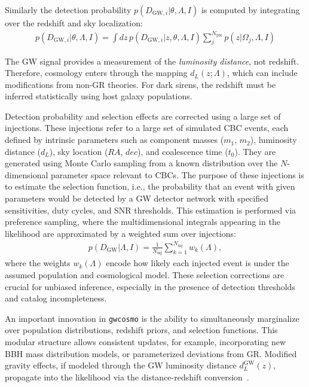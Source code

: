 Similarly the detection probability $p(D_{\mathrm{GW},i} |\theta, \Lambda, I)$ is computed by integrating over the redshift and sky localization:
\begin{align}
    p(D_{\mathrm{GW},i} | \theta, \Lambda, I) = \int dz\, p(D_{\mathrm{GW},i} | z, \theta, \Lambda, I) \sum_{j}^{N_{\mathrm{pix}}} p(z | \Omega_j,\Lambda, I)
\end{align}

The GW signal provides a measurement of the \textit{luminosity distance}, not redshift. Therefore, cosmology enters through the mapping $d_L(z; \Lambda)$, which can include modifications from non-GR theories. For dark sirens, the redshift must be inferred statistically using host galaxy populations. 

Detection probability and selection effects are corrected using a large set of injections. These injections refer to a large set of simulated \ac{CBC} events, each defined by intrinsic parameters such as component masses ($m_1$, $m_2$), luminosity distance ($d_L$), sky location ($RA$, $dec$), and coalescence time ($t_0$). They are generated using Monte Carlo sampling from a known distribution over the $N$-dimensional parameter space relevant to \acp{CBC}. The purpose of these injections is to estimate the selection function, i.e., the probability that an event with given parameters would be detected by a \ac{GW} detector network with specified sensitivities, duty cycles, and \ac{SNR} thresholds. This estimation is performed via preference sampling, where the multidimensional integrals appearing in the likelihood are approximated by a weighted sum over injections:
\begin{align}
    p(D_\mathrm{GW} | \Lambda, I) = \frac{1}{N_{\mathrm{inj}}} \sum_{k=1}^{N_{\mathrm{inj}}} w_k(\Lambda),
\end{align}
where the weights $w_k(\Lambda)$ encode how likely each injected event is under the assumed population and cosmological model. These selection corrections are crucial for unbiased inference, especially in the presence of detection thresholds and catalog incompleteness.

An important innovation in \texttt{gwcosmo} is the ability to simultaneously marginalize over population distributions, redshift priors, and selection functions. This modular structure allows consistent updates, for example, incorporating new BBH mass distribution models, or parameterized deviations from GR. Modified gravity effects, if modeled through the GW luminosity distance $d_L^{\mathrm{GW}}(z)$, propagate into the likelihood via the distance-redshift conversion~\citep{chen2024testing}.

